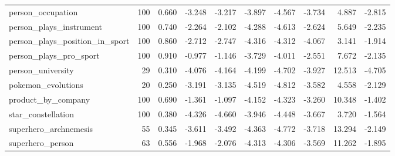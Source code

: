 \begin{table}[htbp]
{\begin{tabular}{lrrrrrrrrr}
person\_occupation & 100 & 0.660 & -3.248 & -3.217 & -3.897 & -4.567 & -3.734 & 4.887 & -2.815 \\
person\_plays\_instrument & 100 & 0.740 & -2.264 & -2.102 & -4.288 & -4.613 & -2.624 & 5.649 & -2.235 \\
person\_plays\_position\_in\_sport & 100 & 0.860 & -2.712 & -2.747 & -4.316 & -4.312 & -4.067 & 3.141 & -1.914 \\
person\_plays\_pro\_sport & 100 & 0.910 & -0.977 & -1.146 & -3.729 & -4.011 & -2.551 & 7.672 & -2.135 \\
person\_university & 29 & 0.310 & -4.076 & -4.164 & -4.199 & -4.702 & -3.927 & 12.513 & -4.705 \\
pokemon\_evolutions & 20 & 0.250 & -3.191 & -3.135 & -4.519 & -4.812 & -3.582 & 4.558 & -2.129 \\
product\_by\_company & 100 & 0.690 & -1.361 & -1.097 & -4.152 & -4.323 & -3.260 & 10.348 & -1.402 \\
star\_constellation & 100 & 0.380 & -4.326 & -4.660 & -3.946 & -4.448 & -3.667 & 3.720 & -1.564 \\
superhero\_archnemesis & 55 & 0.345 & -3.611 & -3.492 & -4.363 & -4.772 & -3.718 & 13.294 & -2.149 \\
superhero\_person & 63 & 0.556 & -1.968 & -2.076 & -4.313 & -4.306 & -3.569 & 11.262 & -1.895 \\
\bottomrule
\end{tabular}}
\end{table}
